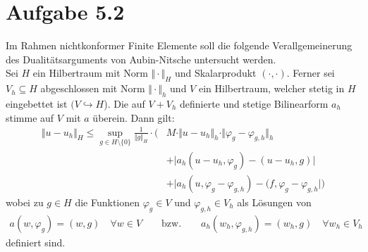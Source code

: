 \documentclass[12pt,a4paper]{article}
\begin{document}
\section*{Aufgabe 5.2}
Im Rahmen nichtkonformer Finite Elemente soll die folgende Verallgemeinerung des Dualitätsarguments von Aubin-Nitsche untersucht werden.\\
Sei $H$ ein Hilbertraum mit Norm $\Vert\cdot\Vert_H$ und Skalarprodukt $(\cdot,\cdot)$. Ferner sei $V_h\subseteq H$ abgeschlossen mit Norm $\Vert\cdot\Vert_h$ und $V$ ein Hilbertraum, welcher stetig in $H$ eingebettet ist $(V\hookrightarrow H$). Die auf $V+V_h$ definierte und stetige Bilinearform $a_h$ stimme auf $V$ mit $a$ überein. Dann gilt:
\begin{align*}
\Vert u-u_h\Vert_H\leq\sup\limits_{g\in H\setminus\lbrace0\rbrace}\frac{1}{\Vert g\Vert_H}\cdot\Big( &M\cdot\Vert u-u_h\Vert_h\cdot\Vert\varphi_g-\varphi_{g,h}\Vert_h\\
&+\big|a_h(u-u_h,\varphi_g)-(u-u_h,g)\big|\\
&+\big|a_h(u,\varphi_g-\varphi_{g,h})-(f,\varphi_g-\varphi_{g,h}\big|\Big)
\end{align*}
wobei zu $g\in H$ die Funktionen $\varphi_g\in V$ und $\varphi_{g,h}\in V_h$ als Lösungen von
\begin{align*}
a(w,\varphi_g)=(w,g)\quad\forall w\in V\qquad\text{bzw.}\qquad a_h(w_h,\varphi_{g,h})=(w_h,g)\quad\forall w_h\in V_h
\end{align*}
definiert sind.
\end{document}
